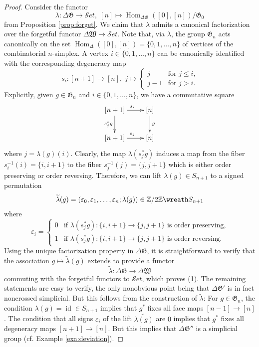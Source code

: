 \documentclass[english,11pt,leqno]{article}
\def\Gen{\mathfrak{G}}
\def\Hom{\operatorname{Hom}}
\def\id{\operatorname{id}}
\def\lra{\longrightarrow}
\def\Hom{\operatorname{Hom}}
\def\Set{ {\mathcal Set}}
\def\Set{ {\mathcal Set}}
\def\Zt{\mathbb{Z}/2\mathbb{Z}}
\def\DG{ {\Delta \Gen}}
\def\DW{ {\Delta {\mathfrak W}}}
\theoremstyle{definition}
\theoremstyle{remark}
\numberwithin{equation}{section}
\begin{document}
\begin{proof} 
	Consider the functor
		\[
			\lambda: \DG \lra \Set, \; [n] \mapsto \Hom_{\DG}([0], [n])/\Gen_0
		\]
	from Proposition \ref{prop:forget}. 
	We claim that $\lambda$ admits a canonical factorization over the forgetful functor $\DW \to \Set$. 
	Note that, via $\lambda$, the group $\Gen_n$ acts canonically on the set
	$\Hom_{\Delta}([0],[n]) = \{0,1,\dots,n\}$ of vertices of the combinatorial $n$-simplex. 
	A vertex $i \in \{0,1,\dots,n\}$ can be canonically identified with the corresponding degeneracy map
	\[
		s_i: [n+1] \lra [n],\; j \mapsto \begin{cases} j & \text{for $j \le i$,}\\
			j-1 & \text{for $j > i$.} \end{cases}
	\] 
	Explicitly, given $g \in \Gen_n$ and $i \in \{0,1,\dots,n\}$, we have a commutative square
	\[
		\xymatrix{
			[n+1] \ar[d]_{s_j^*g} \ar[r]^{s_i} & [n] \ar[d]^g\\
			[n+1] \ar[r]^{s_j} & [n]
		}
	\]
	where $j = \lambda(g)(i)$. Clearly, the map $\lambda(s_j^*g)$ induces a map from the fiber
	$s_i^{-1}(i) = \{i,i+1\}$ to the fiber $s_j^{-1}(j) = \{j,j+1\}$ which is either order
	preserving or order reversing. Therefore, we can lift $\lambda(g) \in S_{n+1}$ to a signed permutation 
	\[
		\widetilde{\lambda}(g) = (\varepsilon_0, \varepsilon_1, \dots, \varepsilon_n ;
		\lambda(g)) \in \Zt \wreath S_{n+1}
	\]
	where 
	\[
		\varepsilon_i = \begin{cases} 0 & \text{if $\lambda(s_j^*g): \{i,i+1\} \to \{j,j+1\}$ is order preserving,}\\
						1 & \text{if $\lambda(s_j^*g): \{i,i+1\} \to \{j,j+1\}$ is order reversing.}
				\end{cases}
	\]
	Using the unique factorization property in $\DG$, it is straightforward to verify 
	that the association $g \mapsto \widetilde{\lambda}(g)$ extends to provide a functor
	\[
		\widetilde{\lambda}: \DG \lra \DW
	\]
	commuting with the forgetful functors to $\Set$, which proves (1). The remaining statements
	are easy to verify, the only nonobvious point being that $\DG'$ is in fact noncrossed
	simplicial. But this follows from the construction of $\widetilde{\lambda}$: For $g \in
	\Gen_n$, the condition $\lambda(g) = \id \in S_{n+1}$ implies that $g^*$ fixes all face maps
	$[n-1] \to [n]$. The condition that all signs $\varepsilon_i$ of the lift
	$\widetilde{\lambda(g)}$ are $0$ implies that $g^*$ fixes all degeneracy maps $[n+1] \to
	[n]$. But this implies that $\DG''$ is a simplicial group (cf. Example \ref{exa:deviation}).
\end{proof}
\end{document}
